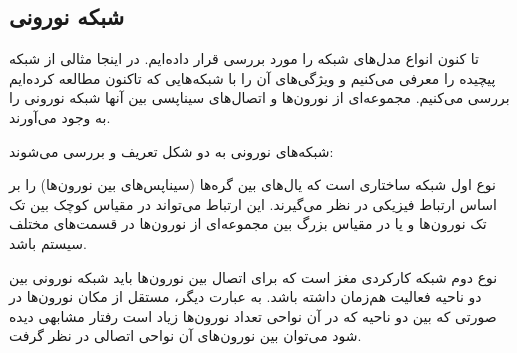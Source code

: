 \subsection{شبکه نورونی}
تا کنون انواع مدل‌های شبکه‌ را مورد بررسی قرار داده‌ایم. در اینجا مثالی از شبکه‌ پیچیده را معرفی می‌کنیم و ویژگی‌های آن را با شبکه‌هایی که تاکنون مطالعه کرده‌ایم بررسی می‌کنیم. مجموعه‌ای از نورون‌ها و اتصال‌های سیناپسی بین ‌آنها شبکه نورونی را به وجود می‌آورند.

شبکه‌های نورونی به دو شکل تعریف و بررسی می‌شوند:
 
نوع اول شبکه ساختاری است که یال‌های بین گره‌ها (سیناپس‌های بین نورون‌ها) را بر اساس ارتباط فیزیکی در نظر می‌گیرند. این ارتباط می‌تواند در مقیاس کوچک بین تک تک نورون‌ها و یا در مقیاس بزرگ بین مجموعه‌ای از نورون‌ها در قسمت‌های مختلف سیستم باشد. 

نوع دوم شبکه کارکردی مغز است که برای اتصال بین نورون‌ها باید شبکه نورونی بین دو ناحیه فعالیت هم‌زمان داشته باشد. به عبارت دیگر، مستقل از مکان نورون‌ها در صورتی که بین دو ناحیه که در آن نواحی تعداد نورون‌ها زیاد است  رفتار مشابهی دیده شود می‌توان بین نورون‌های آن نواحی اتصالی در نظر گرفت.

